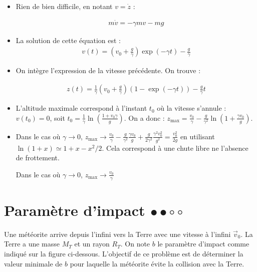 \begin{correction}

\begin{itemize}
\item Rien de bien difficile, en notant $v=\dot{z}$ :

\begin{align*}
	m\dot{v}=-\gamma mv-mg
\end{align*}

\item
La solution de cette équation est :
\begin{align*}
	v(t) = \left(v_0+\frac{g}{\gamma} \right)\exp\left(-\gamma t\right)-\frac{g}{\gamma}  
\end{align*}

\item On intègre l'expression de la vitesse précédente. On trouve :

\begin{align*}
	z(t) = \frac{1}{\gamma}\left(v_0+\frac{g}{\gamma} \right) \left(1-\exp(-\gamma t) \right) -\frac{g}{\gamma}t
\end{align*}
\item L'altitude maximale correspond à l'instant $t_0$ où la vitesse s'annule : $v(t_0)=0$, soit $t_0 = \frac{1}{\gamma}\ln\left(\frac{1+v_0\gamma}{g} \right) $. On a donc :
$z_\mathrm{max}=\frac{v_0}{\gamma}-\frac{g}{\gamma^2}\ln\left( 1+\frac{\gamma v_0}{g}\right).$

\item Dans le cas où $\gamma\rightarrow0$, $z_\mathrm{max}\rightarrow\frac{v_0}{\gamma}-\frac{g}{\gamma^2}\frac{\gamma v_0}{g}+\frac{g}{2\gamma^2}\frac{\gamma^2 v_0^2}{g^2}=\frac{ v_0^2}{2g}$ en utilisant $\ln(1+x)\simeq 1+x-x^2/2$. Cela correspond à une chute libre ne l'absence de frottement. 

Dans le cas où $\gamma\rightarrow0$, $z_\mathrm{max}\rightarrow\frac{v_0}{\gamma}$

\end{itemize}

\end{correction}

\newpage

\section{Paramètre d'impact $\bullet\bullet\circ\circ$}

Une météorite arrive depuis l'infini vers la Terre avec une vitesse à l'infini $\vec{v}_0$. La Terre a une masse $M_T$ et un rayon $R_T$. On note $b$ le paramètre d'impact comme indiqué sur la figure ci-dessous. L'objectif de ce problème est de déterminer la valeur minimale de $b$ pour laquelle la météorite évite la collision avec la Terre.

